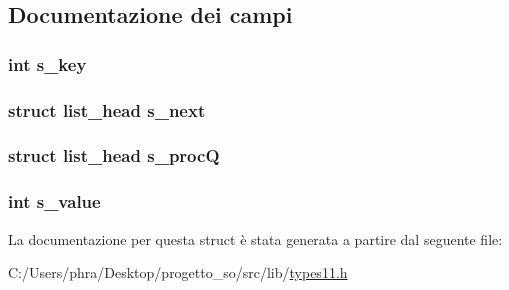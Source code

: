 \subsection{Documentazione dei campi}
\hypertarget{structsemd__t_a2f9b394e0876b74e8f9e0a53c8aa7e0c}{
\subsubsection[{s\-\_\-key}]{\setlength{\rightskip}{0pt plus 5cm}int s\-\_\-key}}\label{structsemd__t_a2f9b394e0876b74e8f9e0a53c8aa7e0c}
\hypertarget{structsemd__t_a09cdbeceec30846f32399900706a408f}{
\subsubsection[{s\-\_\-next}]{\setlength{\rightskip}{0pt plus 5cm}struct {\bf list\-\_\-head} s\-\_\-next}}\label{structsemd__t_a09cdbeceec30846f32399900706a408f}
\hypertarget{structsemd__t_a9a531117316667eceb70495342c36be1}{
\subsubsection[{s\-\_\-proc\-Q}]{\setlength{\rightskip}{0pt plus 5cm}struct {\bf list\-\_\-head} s\-\_\-proc\-Q}}\label{structsemd__t_a9a531117316667eceb70495342c36be1}
\hypertarget{structsemd__t_a104d7150b55e51644df16fdc9814191f}{
\subsubsection[{s\-\_\-value}]{\setlength{\rightskip}{0pt plus 5cm}int s\-\_\-value}}\label{structsemd__t_a104d7150b55e51644df16fdc9814191f}


La documentazione per questa struct è stata generata a partire dal seguente file\-:\begin{DoxyCompactItemize}
\item 
C\-:/\-Users/phra/\-Desktop/progetto\-\_\-so/src/lib/\hyperlink{types11_8h}{types11.\-h}\end{DoxyCompactItemize}
